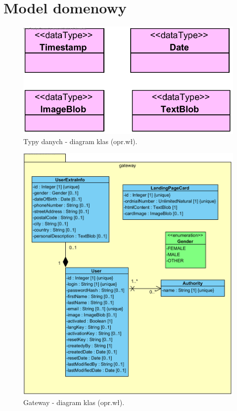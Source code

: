 \section{Model domenowy}\label{sec:domainModel}

\begin{minipage}{\textwidth}
    \begin{figure}[H]
        \centering\includegraphics[scale=0.7]{../uml/class_diagrams/dataTypes.png}
        \caption{Typy danych - diagram klas (opr.wł).}\label{rysunek:class-diagram-data-types}
    \end{figure}
\end{minipage}

\begin{minipage}{\textwidth}
    \begin{figure}[H]
        \centering\includegraphics[scale=0.7]{../uml/class_diagrams/gateway.png}
        \caption{Gateway - diagram klas (opr.wł).}\label{rysunek:class-diagram-gateway}
    \end{figure}
\end{minipage}

